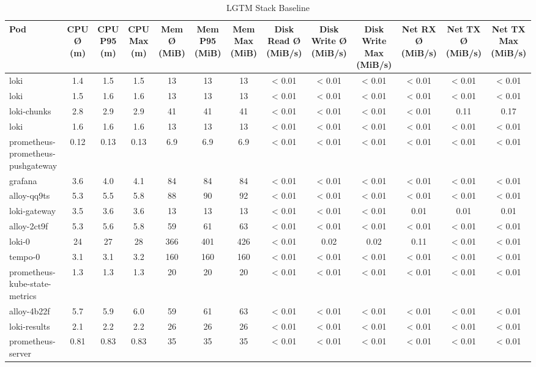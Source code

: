 \begin{table}[h!]
  \begin{center}
    \begin{tabular}{l|S|S|S|S|S|S|S|S|S|S|S|S}
      \textbf{Pod} & \textbf{CPU Ø (m)} & \textbf{CPU P95 (m)} & \textbf{CPU Max (m)} & \textbf{Mem Ø (MiB)} & \textbf{Mem P95 (MiB)} & \textbf{Mem Max (MiB)} & \textbf{Disk Read Ø (MiB/s)} & \textbf{Disk Write Ø (MiB/s)} & \textbf{Disk Write Max (MiB/s)} & \textbf{Net RX Ø (MiB/s)} & \textbf{Net TX Ø (MiB/s)} & \textbf{Net TX Max (MiB/s)}\\
      \hline
      loki & 1.4 & 1.5 & 1.5 & 13 & 13 & 13 & < 0.01 & < 0.01 & < 0.01 & < 0.01 & < 0.01 & < 0.01\\
      loki & 1.5 & 1.6 & 1.6 & 13 & 13 & 13 & < 0.01 & < 0.01 & < 0.01 & < 0.01 & < 0.01 & < 0.01\\
      loki-chunks & 2.8 & 2.9 & 2.9 & 41 & 41 & 41 & < 0.01 & < 0.01 & < 0.01 & < 0.01 & 0.11 & 0.17\\
      loki & 1.6 & 1.6 & 1.6 & 13 & 13 & 13 & < 0.01 & < 0.01 & < 0.01 & < 0.01 & < 0.01 & < 0.01\\
      prometheus-prometheus-pushgateway & 0.12 & 0.13 & 0.13 & 6.9 & 6.9 & 6.9 & < 0.01 & < 0.01 & < 0.01 & < 0.01 & < 0.01 & < 0.01\\
      grafana & 3.6 & 4.0 & 4.1 & 84 & 84 & 84 & < 0.01 & < 0.01 & < 0.01 & < 0.01 & < 0.01 & < 0.01\\
      alloy-qq9ts & 5.3 & 5.5 & 5.8 & 88 & 90 & 92 & < 0.01 & < 0.01 & < 0.01 & < 0.01 & < 0.01 & < 0.01\\
      loki-gateway & 3.5 & 3.6 & 3.6 & 13 & 13 & 13 & < 0.01 & < 0.01 & < 0.01 & 0.01 & 0.01 & 0.01\\
      alloy-2ct9f & 5.3 & 5.6 & 5.8 & 59 & 61 & 63 & < 0.01 & < 0.01 & < 0.01 & < 0.01 & < 0.01 & < 0.01\\
      loki-0 & 24 & 27 & 28 & 366 & 401 & 426 & < 0.01 & 0.02 & 0.02 & 0.11 & < 0.01 & < 0.01\\
      tempo-0 & 3.1 & 3.1 & 3.2 & 160 & 160 & 160 & < 0.01 & < 0.01 & < 0.01 & < 0.01 & < 0.01 & < 0.01\\
      prometheus-kube-state-metrics & 1.3 & 1.3 & 1.3 & 20 & 20 & 20 & < 0.01 & < 0.01 & < 0.01 & < 0.01 & < 0.01 & < 0.01\\
      alloy-4b22f & 5.7 & 5.9 & 6.0 & 59 & 61 & 63 & < 0.01 & < 0.01 & < 0.01 & < 0.01 & < 0.01 & < 0.01\\
      loki-results & 2.1 & 2.2 & 2.2 & 26 & 26 & 26 & < 0.01 & < 0.01 & < 0.01 & < 0.01 & < 0.01 & < 0.01\\
      prometheus-server & 0.81 & 0.83 & 0.83 & 35 & 35 & 35 & < 0.01 & < 0.01 & < 0.01 & < 0.01 & < 0.01 & < 0.01\\
    \end{tabular}
  \end{center}
  \caption{LGTM Stack Baseline}
  \label{tab:baseline}
\end{table}